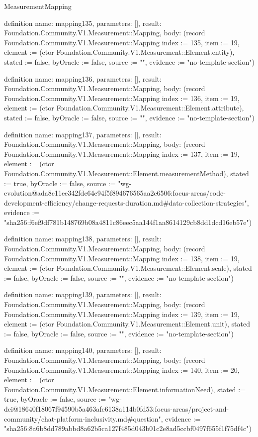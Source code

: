 \begin{lexlean}{MeasurementMapping}
\begin{semanticmodule}
definition{
  name: mapping135,
  parameters: [],
  result: Foundation.Community.V1.Measurement::Mapping,
  body: (record Foundation.Community.V1.Measurement::Mapping {index := 135, item := 19, element := (ctor Foundation.Community.V1.Measurement::Element.entity), stated := false, byOracle := false, source := "", evidence := "no-template-section"})
}

definition{
  name: mapping136,
  parameters: [],
  result: Foundation.Community.V1.Measurement::Mapping,
  body: (record Foundation.Community.V1.Measurement::Mapping {index := 136, item := 19, element := (ctor Foundation.Community.V1.Measurement::Element.attribute), stated := false, byOracle := false, source := "", evidence := "no-template-section"})
}

definition{
  name: mapping137,
  parameters: [],
  result: Foundation.Community.V1.Measurement::Mapping,
  body: (record Foundation.Community.V1.Measurement::Mapping {index := 137, item := 19, element := (ctor Foundation.Community.V1.Measurement::Element.measurementMethod), stated := true, byOracle := false, source := "wg-evolution@ada8c11ee342fdc64e94f5f894676565aa2e6506:focus-areas/code-development-efficiency/change-requests-duration.md#data-collection-strategies", evidence := "sha256:f6ef9df781b148769b08a4811c86eec5aa144f1aa8614129cb8dd1dcd16eb57e"})
}

definition{
  name: mapping138,
  parameters: [],
  result: Foundation.Community.V1.Measurement::Mapping,
  body: (record Foundation.Community.V1.Measurement::Mapping {index := 138, item := 19, element := (ctor Foundation.Community.V1.Measurement::Element.scale), stated := false, byOracle := false, source := "", evidence := "no-template-section"})
}

definition{
  name: mapping139,
  parameters: [],
  result: Foundation.Community.V1.Measurement::Mapping,
  body: (record Foundation.Community.V1.Measurement::Mapping {index := 139, item := 19, element := (ctor Foundation.Community.V1.Measurement::Element.unit), stated := false, byOracle := false, source := "", evidence := "no-template-section"})
}

definition{
  name: mapping140,
  parameters: [],
  result: Foundation.Community.V1.Measurement::Mapping,
  body: (record Foundation.Community.V1.Measurement::Mapping {index := 140, item := 20, element := (ctor Foundation.Community.V1.Measurement::Element.informationNeed), stated := true, byOracle := false, source := "wg-dei@18640f18067f94590b5a463afe6138a114b0fd53:focus-areas/project-and-community/chat-platform-inclusivity.md#question", evidence := "sha256:8a6b8dd789abbd8a62b5ca127f485d043b01c2e8ad5ccbf0497f655f1f75df4c"})
}


\end{semanticmodule}
\end{lexlean}
